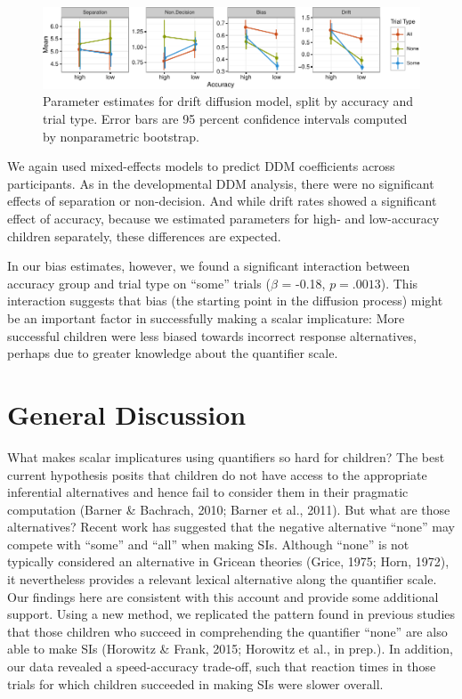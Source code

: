 \documentclass[10pt, letterpaper]{article}
\newenvironment{CodeChunk}{}{}
\begin{document}
\begin{CodeChunk}
\begin{figure}[!tb]

{\centering \includegraphics{figs/param_plot-1} 

}

\caption[Parameter estimates for drift diffusion model, split by accuracy and trial type]{Parameter estimates for drift diffusion model, split by accuracy and trial type. Error bars are 95 percent confidence intervals computed by nonparametric bootstrap.}\label{fig:param_plot}
\end{figure}
\end{CodeChunk}

We again used mixed-effects models to predict DDM coefficients across
participants. As in the developmental DDM analysis, there were no
significant effects of separation or non-decision. And while drift rates
showed a significant effect of accuracy, because we estimated parameters
for high- and low-accuracy children separately, these differences are
expected.

In our bias estimates, however, we found a significant interaction
between accuracy group and trial type on ``some'' trials (\(\beta\) =
-0.18, \(p = .0013\)). This interaction suggests that bias (the starting
point in the diffusion process) might be an important factor in
successfully making a scalar implicature: More successful children were
less biased towards incorrect response alternatives, perhaps due to
greater knowledge about the quantifier scale.

\section{General Discussion}\label{general-discussion}

What makes scalar implicatures using quantifiers so hard for children?
The best current hypothesis posits that children do not have access to
the appropriate inferential alternatives and hence fail to consider them
in their pragmatic computation (Barner \& Bachrach, 2010; Barner et al.,
2011). But what are those alternatives? Recent work has suggested that
the negative alternative ``none'' may compete with ``some'' and ``all''
when making SIs. Although ``none'' is not typically considered an
alternative in Gricean theories (Grice, 1975; Horn, 1972), it
nevertheless provides a relevant lexical alternative along the
quantifier scale. Our findings here are consistent with this account and
provide some additional support. Using a new method, we replicated the
pattern found in previous studies that those children who succeed in
comprehending the quantifier ``none'' are also able to make SIs
(Horowitz \& Frank, 2015; Horowitz et al., in prep.). In addition, our
data revealed a speed-accuracy trade-off, such that reaction times in
those trials for which children succeeded in making SIs were slower
overall.
\end{document}
